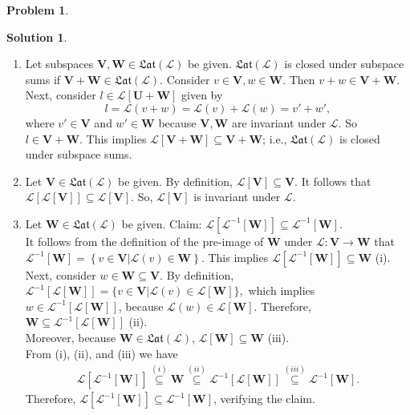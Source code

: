 \documentclass{book}
\theoremstyle{definition}
\newtheorem*{prob*}{Problem}
\newtheorem*{sln*}{Solution}
\newcommand{\V}{\mathbf{V}}
\newcommand{\W}{\mathbf{W}}
\newcommand{\U}{\mathbf{U}}
\newcommand{\lag}{\mathcal{L}}
\begin{document}
\begin{prob*}
\begin{sln*}
\begin{enumerate}
			\item Let subspaces $\V,\W \in \mathfrak{Lat}(\lag)$ be given. $\mathfrak{Lat}(\lag)$ is closed under subspace sums if $\V + \W \in \mathfrak{Lat}(\lag)$. Consider $v\in\V, w\in\W$. Then $v+w \in \V + \W$. Next, consider $l\in \lag[\U+\W]$ given by
			$$l = \lag(v+w) = \lag(v) + \lag(w) = v' + w',$$
			where $v'\in \V$ and $w'\in\W$ because $\V,\W$ are invariant under $\lag$. So $l \in \V+\W$. This implies $ \lag[\V+\W] \subseteq \V+\W $; i.e., $\mathfrak{Lat}(\lag)$ is closed under subspace sums.    \\
			
			\item Let $\V \in \mathfrak{Lat}(\lag)$ be given. By definition, $\lag[\V] \subseteq \V$. It follows that $\lag\left[ \lag[\V] \right] \subseteq \lag[\V]$. So, $\lag[\V]$ is invariant under $\lag$.\\
			
			\item Let $\W \in \mathfrak{Lat}(\lag)$ be given. Claim: $\lag\left[\lag^{-1}[\W] \right] \subseteq \lag^{-1}[\W] $.\\
			
			It follows from the definition of the pre-image of $\W$ under $\lag : \V \to \W$ that $\lag^{-1}[\W] = \left\{ v \in \V \vert \lag(v) \in \W \right\}$. This implies $\lag\left[\lag^{-1}[\W]\right] \subseteq \W$ (i).\\
			
			Next, consider $w\in\W \subseteq \V$. By definition, $\lag^{-1}\left[\lag[\W] \right] = \{ v\in \V \vert \lag(v) \in \lag[\W]\},$ which implies $w \in \lag^{-1}[
			\lag[\W]]$, because $\lag(w) \in \lag[\W]$. Therefore, $\W \subseteq \lag^{-1}\left[\lag[\W]\right]$ (ii).\\   
			
			Moreover, because $\W \in \mathfrak{Lat}(\lag)$, $\lag[\W] \subseteq \W$ (iii).\\ 
			
			From (i), (ii), and (iii) we have
			\begin{align*}
			\lag\left[ \lag^{-1}[\W] \right] \stackrel{(i)}\subseteq \W \stackrel{(ii)}\subseteq \lag^{-1}\left[ \lag[\W] \right] \stackrel{(iii)}\subseteq \lag^{-1}[\W].
			\end{align*} 
			Therefore, $\lag\left[ \lag^{-1}[\W] \right] \subseteq \lag^{-1}[\W] $, verifying the claim.
			
			
		\end{enumerate}
	\end{sln*}
	
\end{prob*}
\end{document}
